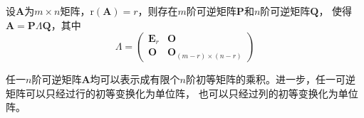 \begin{theorem}[矩阵的分解]
    设$\boldsymbol{A}$为$m\times n$矩阵，$\mathrm{r}(\boldsymbol{A})=r$，则存在$m$阶可逆矩阵$\boldsymbol{P}$和$n$阶可逆矩阵$\boldsymbol{Q}$，
    使得$\boldsymbol{A}=\boldsymbol{P}\Lambda \boldsymbol{Q}$，其中
    $$\Lambda=\left( \begin{array}{ll}
        \boldsymbol{E}_r & \boldsymbol{O} \\
        \boldsymbol{O} & \boldsymbol{O}_{(m-r)\times(n-r)}
    \end{array}\right)$$
\end{theorem}

\begin{theorem}
    任一$n$阶可逆矩阵$\boldsymbol{A}$均可以表示成有限个$n$阶初等矩阵的乘积。进一步，任一可逆矩阵可以只经过行的初等变换化为单位阵，
    也可以只经过列的初等变换化为单位阵。
\end{theorem}

